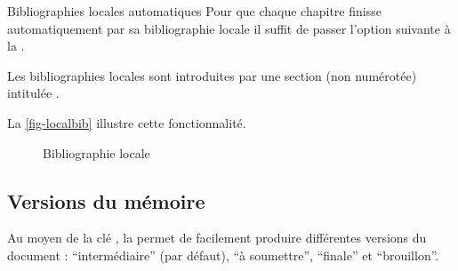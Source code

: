 \begin{dbexample}{Bibliographies locales automatiques}{}
  Pour que chaque chapitre finisse automatiquement par sa bibliographie locale
  il suffit de passer l'option suivante à la \yatCl{}.
\end{dbexample}

Les bibliographies locales sont introduites par une section (non numérotée)
intitulée .

La \vref{fig-localbib} illustre cette fonctionnalité.
\begin{figure}[htbp]
  \centering
  \caption{Bibliographie locale}
  \label{fig-localbib}
\end{figure}

\subsection{Versions du mémoire}\label{sec-versions}
%

Au moyen de la clé , la \yatCl{} permet de facilement produire
différentes versions du document : \enquote{intermédiaire} (par défaut),
\enquote{à soumettre}, \enquote{finale} et \enquote{brouillon}.

